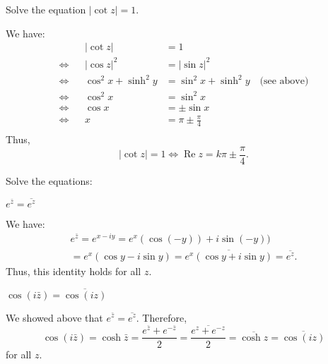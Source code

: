 \documentclass[12pt, answers]{exam}
\renewcommand{\Re}{\operatorname{Re}}
\begin{document}
\begin{questions}
    \question Solve the equation $|\cot z|=1$.
    \begin{solution}
        We have:
        \begin{align*}
            &
            &|\cot z| &= 1\\
            \Longleftrightarrow&
            &|\cos z|^2 &= |\sin z|^2\\
            \Longleftrightarrow&
            &\cos^2 x+\sinh^2 y &= \sin^2 x+ \sinh^2 y\quad\text{(see above)}\\
            \Longleftrightarrow&
            &\cos^2 x &= \sin^2 x\\
            \Longleftrightarrow&
            &\cos x &= \pm \sin x\\
            \Longleftrightarrow&
            & x &= \pi \pm \frac\pi4\\
        \end{align*}
        Thus,
        \[
            |\cot z| = 1\Longleftrightarrow\Re z = k\pi \pm \frac\pi4.
        \]
    \end{solution}



    \question
    Solve the equations:
    \begin{parts}
        \item $e^{\bar{z}}=\overline{e^z}$
        \begin{solution}
            We have:
            \begin{multline*}
                e^{\bar z} = e^{x-iy} = e^x(\cos(-y)) + i\sin(-y))\\ = e^x(\cos y - i\sin y) = 
                \overline{e^x(\cos y + i\sin y)} = \overline{e^z}.
            \end{multline*}
            Thus, this identity holds for all $z$.
        \end{solution}

        \item $\cos(i\bar z) = \overline{\cos(iz)}$
        \begin{solution}
            We showed above that $e^{\bar z} = \overline{e^z}$. Therefore,
            \[
                \cos(i\bar z) = \cosh\bar z = \frac{e^{\bar z} + e^{-\bar z}}2
                = \overline{\frac{e^{z} + e^{- z}}2}
                = \overline{\cosh z}
                = \overline{\cos(iz)}
            \]
            for all $z$.
        \end{solution}
    \end{parts}
\end{questions}
\end{document}
